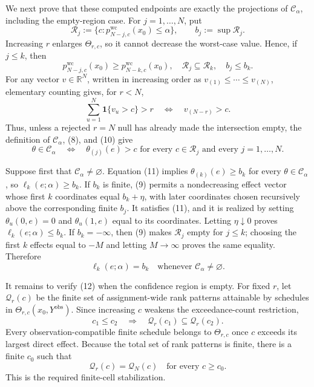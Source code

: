We next prove that these computed endpoints are exactly the projections of \(\mathcal C_\alpha\), including the empty-region case.  For \(j=1,\ldots,N\), put
\[
\mathcal R_j:=\{c:p^{\mathrm{wc}}_{N-j,c}(x_0)\leq\alpha\},
\qquad b_j:=\sup\mathcal R_j.
\tag{8}
\]
Increasing \(r\) enlarges \(\Theta_{r,c}\), so it cannot decrease the worst-case value.  Hence, if \(j\leq k\), then
\[
p^{\mathrm{wc}}_{N-j,c}(x_0)
\geq p^{\mathrm{wc}}_{N-k,c}(x_0),
\quad
\mathcal R_j\subseteq\mathcal R_k,
\quad
b_j\leq b_k.
\tag{9}
\]
For any vector \(v\in\mathbb R^N\), written in increasing order as \(v_{(1)}\leq\cdots\leq v_{(N)}\), elementary counting gives, for \(r<N\),
\[
\sum_{u=1}^N\mathbf 1\{v_u>c\}>r
\quad\Longleftrightarrow\quad
v_{(N-r)}>c.
\tag{10}
\]
Thus, unless a rejected \(r=N\) null has already made the intersection empty, the definition of \(\mathcal C_\alpha\), (8), and (10) give
\[
\theta\in\mathcal C_\alpha
\quad\Longleftrightarrow\quad
\theta_{(j)}(e)>c
\text{ for every }c\in\mathcal R_j
\text{ and every }j=1,\ldots,N.
\tag{11}
\]

Suppose first that \(\mathcal C_\alpha\neq\varnothing\).  Equation (11) implies \(\theta_{(k)}(e)\geq b_k\) for every \(\theta\in\mathcal C_\alpha\), so \(\ell_k(e;\alpha)\geq b_k\).  If \(b_k\) is finite, (9) permits a nondecreasing effect vector whose first \(k\) coordinates equal \(b_k+\eta\), with later coordinates chosen recursively above the corresponding finite \(b_j\).  It satisfies (11), and it is realized by setting \(\theta_u(0,e)=0\) and \(\theta_u(1,e)\) equal to its coordinates.  Letting \(\eta\downarrow0\) proves \(\ell_k(e;\alpha)\leq b_k\).  If \(b_k=-\infty\), then (9) makes \(\mathcal R_j\) empty for \(j\leq k\); choosing the first \(k\) effects equal to \(-M\) and letting \(M\to\infty\) proves the same equality.  Therefore
\[
\ell_k(e;\alpha)=b_k
\quad\text{whenever }\mathcal C_\alpha\neq\varnothing.
\tag{12}
\]

It remains to verify (12) when the confidence region is empty.  For fixed \(r\), let \(\mathcal Q_r(c)\) be the finite set of assignment-wide rank patterns attainable by schedules in \(\Theta_{r,c}(x_0,Y^{\mathrm{obs}})\).  Since increasing \(c\) weakens the exceedance-count restriction,
\[
c_1\leq c_2\quad\Longrightarrow\quad
\mathcal Q_r(c_1)\subseteq\mathcal Q_r(c_2).
\tag{13}
\]
Every observation-compatible finite schedule belongs to \(\Theta_{r,c}\) once \(c\) exceeds its largest direct effect.  Because the total set of rank patterns is finite, there is a finite \(c_0\) such that
\[
\mathcal Q_r(c)=\mathcal Q_N(c)
\quad\text{for every }c\geq c_0.
\tag{14}
\]
This is the required finite-cell stabilization.


